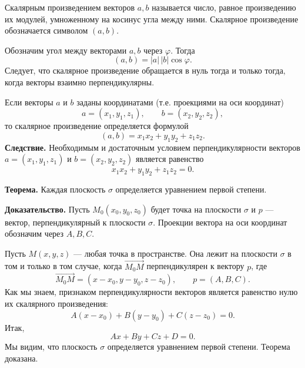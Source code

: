 \begin{rusblock}
Скалярным произведением векторов $a,b$ называется число, равное произведению их модулей, умноженному на косинус угла между ними. Скалярное произведение обозначается символом $(a,b)$.

Обозначим угол между векторами $a,b$ через $\varphi$. Тогда
\[
(a,b)=|a|\,|b|\cos\varphi.
\]
Следует, что скалярное произведение обращается в нуль тогда и только тогда, когда векторы взаимно перпендикулярны.

Если векторы $a$ и $b$ заданы координатами (т.е. проекциями на оси координат)
\[
a=(x_1,y_1,z_1),\qquad b=(x_2,y_2,z_2),
\]
то скалярное произведение определяется формулой
\[
(a,b)=x_1x_2+y_1y_2+z_1z_2.
\]
\textbf{Следствие.} Необходимым и достаточным условием перпендикулярности векторов $a=(x_1,y_1,z_1)$ и $b=(x_2,y_2,z_2)$ является равенство
\[
x_1x_2+y_1y_2+z_1z_2=0.
\]
\end{rusblock}

\begin{rusblock}
\textbf{Теорема.} Каждая плоскость $\sigma$ определяется уравнением первой степени.

\textbf{Доказательство.} Пусть $M_0(x_0,y_0,z_0)$ будет точка на плоскости $\sigma$ и $p$ --- вектор, перпендикулярный к плоскости $\sigma$. Проекции вектора на оси координат обозначим через $A,B,C$.

Пусть $M(x,y,z)$ --- любая точка в пространстве. Она лежит на плоскости $\sigma$ в том и только в том случае, когда $\overrightarrow{M_0M}$ перпендикулярен к вектору $p$, где
\[
\overrightarrow{M_0M}=(x-x_0,y-y_0,z-z_0),\qquad p=(A,B,C).
\]
Как мы знаем, признаком перпендикулярности векторов является равенство нулю их скалярного произведения:
\[
A(x-x_0)+B(y-y_0)+C(z-z_0)=0.
\]
Итак,
\[
Ax+By+Cz+D=0.
\]
Мы видим, что плоскость $\sigma$ определяется уравнением первой степени. Теорема доказана.
\end{rusblock}


